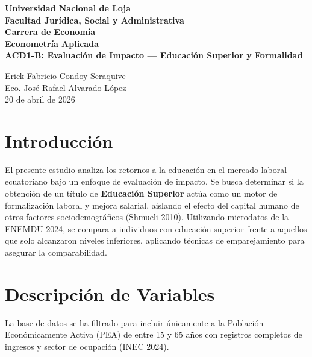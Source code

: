 \documentclass[12pt,spanish]{article}
\begin{document}
\begin{center}
    {\bfseries \Large Universidad Nacional de Loja}\\[0.3cm]
    {\bfseries \large Facultad Jurídica, Social y
Administrativa}\\[0.2cm]
    {\bfseries Carrera de Economía}\\[1.5cm]
    
    {\bfseries \large Econometría Aplicada}\\[1cm]
    
    {\bfseries \Large ACD1-B: Evaluación de Impacto --- Educación
Superior y Formalidad}\\[1.5cm]
\end{center}

 Erick Fabricio Condoy Seraquive \\
 Eco. José Rafael Alvarado López \\
 20 de abril de 2026 \\

\vspace{1cm}

\doublespacing
\setlength{\parindent}{1.27cm}

\section{Introducción}\label{introducciuxf3n}

El presente estudio analiza los retornos a la educación en el mercado
laboral ecuatoriano bajo un enfoque de evaluación de impacto. Se busca
determinar si la obtención de un título de \textbf{Educación Superior}
actúa como un motor de formalización laboral y mejora salarial, aislando
el efecto del capital humano de otros factores sociodemográficos
(Shmueli 2010). Utilizando microdatos de la ENEMDU 2024, se compara a
individuos con educación superior frente a aquellos que solo alcanzaron
niveles inferiores, aplicando técnicas de emparejamiento para asegurar
la comparabilidad.

\section{Descripción de Variables}\label{descripciuxf3n-de-variables}

La base de datos se ha filtrado para incluir únicamente a la Población
Económicamente Activa (PEA) de entre 15 y 65 años con registros
completos de ingresos y sector de ocupación (INEC 2024).
\end{document}

